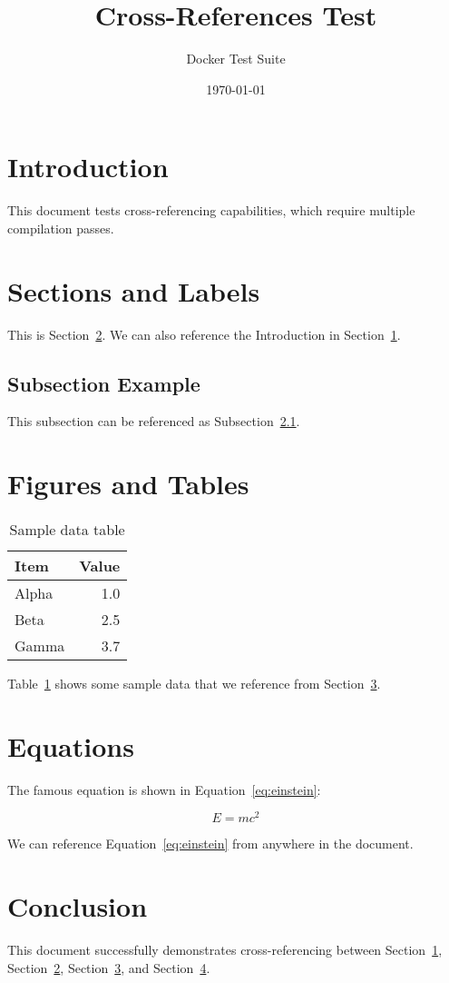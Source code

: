 \documentclass{article}
\title{Cross-References Test}
\author{Docker Test Suite}
\date{\today}
\begin{document}
\maketitle

\tableofcontents

\section{Introduction}
\label{sec:intro}
This document tests cross-referencing capabilities, which require multiple compilation passes.

\section{Sections and Labels}
\label{sec:sections}
This is Section~\ref{sec:sections}. We can also reference the Introduction in Section~\ref{sec:intro}.

\subsection{Subsection Example}
\label{subsec:example}
This subsection can be referenced as Subsection~\ref{subsec:example}.

\section{Figures and Tables}
\label{sec:figures}

\begin{table}[h]
\centering
\begin{tabular}{|l|r|}
\hline
Item & Value \\
\hline
Alpha & 1.0 \\
Beta & 2.5 \\
Gamma & 3.7 \\
\hline
\end{tabular}
\caption{Sample data table}
\label{tab:sample}
\end{table}

Table~\ref{tab:sample} shows some sample data that we reference from Section~\ref{sec:figures}.

\section{Equations}
\label{sec:equations}

The famous equation is shown in Equation~\ref{eq:einstein}:

\begin{equation}
E = mc^2
\label{eq:einstein}
\end{equation}

We can reference Equation~\ref{eq:einstein} from anywhere in the document.

\section{Conclusion}
This document successfully demonstrates cross-referencing between Section~\ref{sec:intro}, Section~\ref{sec:sections}, Section~\ref{sec:figures}, and Section~\ref{sec:equations}.
\end{document}
